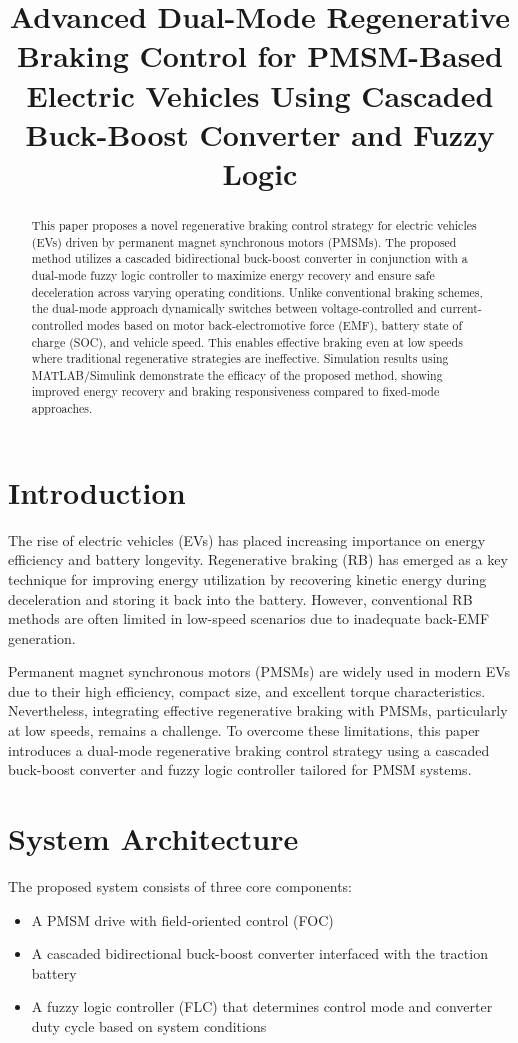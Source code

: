\documentclass{article}
\begin{document}
\begin{abstract}
This paper proposes a novel regenerative braking control strategy for electric vehicles (EVs) driven by permanent magnet synchronous motors (PMSMs). The proposed method utilizes a cascaded bidirectional buck-boost converter in conjunction with a dual-mode fuzzy logic controller to maximize energy recovery and ensure safe deceleration across varying operating conditions. Unlike conventional braking schemes, the dual-mode approach dynamically switches between voltage-controlled and current-controlled modes based on motor back-electromotive force (EMF), battery state of charge (SOC), and vehicle speed. This enables effective braking even at low speeds where traditional regenerative strategies are ineffective. Simulation results using MATLAB/Simulink demonstrate the efficacy of the proposed method, showing improved energy recovery and braking responsiveness compared to fixed-mode approaches.
\end{abstract}

\title{Advanced Dual-Mode Regenerative Braking Control for PMSM-Based Electric Vehicles Using Cascaded Buck-Boost Converter and Fuzzy Logic}

\maketitle

\section{Introduction}
The rise of electric vehicles (EVs) has placed increasing importance on energy efficiency and battery longevity. Regenerative braking (RB) has emerged as a key technique for improving energy utilization by recovering kinetic energy during deceleration and storing it back into the battery. However, conventional RB methods are often limited in low-speed scenarios due to inadequate back-EMF generation.

Permanent magnet synchronous motors (PMSMs) are widely used in modern EVs due to their high efficiency, compact size, and excellent torque characteristics. Nevertheless, integrating effective regenerative braking with PMSMs, particularly at low speeds, remains a challenge. To overcome these limitations, this paper introduces a dual-mode regenerative braking control strategy using a cascaded buck-boost converter and fuzzy logic controller tailored for PMSM systems.

\section{System Architecture}
The proposed system consists of three core components:
\begin{itemize}
    \item A PMSM drive with field-oriented control (FOC)
    \item A cascaded bidirectional buck-boost converter interfaced with the traction battery
    \item A fuzzy logic controller (FLC) that determines control mode and converter duty cycle based on system conditions
\end{itemize}
\end{document}
